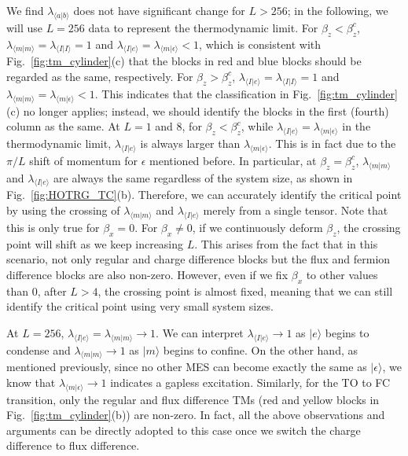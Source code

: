 \documentclass{ntuthesis}
\begin{document}
We find  $\lambda_{\langle a | b \rangle}$ does not  have significant change for  $L > 256$; in the following, we will use $L=256$ data to represent the thermodynamic limit.  
%
For $\beta_z < \beta_z^c$, $\lambda_{\langle m|m\rangle} = \lambda_{\langle I|I\rangle} = 1$ and $\lambda_{\langle I|e\rangle} = \lambda_{\langle m|\epsilon\rangle} <1$, which is consistent with Fig.~\ref{fig:tm_cylinder}(c) that the blocks in red and blue blocks should be regarded as the same, respectively.
%
 For $\beta_z > \beta_z^c$, $\lambda_{\langle I|e\rangle} = \lambda_{\langle I|I\rangle} = 1$ and $\lambda_{\langle m|m\rangle} = \lambda_{\langle m|\epsilon\rangle} <1$. 
 This indicates that the classification in Fig.~\ref{fig:tm_cylinder}(c) no longer applies; instead, we should identify the blocks in the first (fourth) column as the same.
%
At $L = 1$ and $8$, for $\beta_z < \beta_z^c$, while $\lambda_{\langle I|e\rangle} = \lambda_{\langle m|\epsilon\rangle} $ in the thermodynamic limit, $\lambda_{\langle I|e\rangle} $ is always larger than $\lambda_{\langle m|\epsilon\rangle}$. 
%
This is in fact due to the $\pi/L$ shift of momentum for $\epsilon$ mentioned before.
%
In particular, at   $\beta_z = \beta_z^c$,   $\lambda_{\langle m|m\rangle}$ and $\lambda_{\langle I|e\rangle}$ are always the same regardless of the system size, as shown in Fig.~\ref{fig:HOTRG_TC}(b). 
%
Therefore, we can accurately identify the critical point by using the crossing of $\lambda_{\langle m|m\rangle}$ and $\lambda_{\langle I|e\rangle}$ merely from a single tensor. 
%
Note that this is only true for $\beta_x = 0$. 
%
For $\beta_x\ne 0$, if we continuously deform $\beta_z$, the crossing point will shift  as we keep increasing $L$. 
%
This arises from the fact that in this scenario, not only regular and charge difference blocks but the flux and fermion difference blocks are also non-zero. 
%
However, even if we fix $\beta_x$ to other values than $0$, after $L > 4$, the crossing point is almost fixed, meaning that we can still identify the critical point using very small system sizes. 

At $L = 256$, $\lambda_{\langle I|e\rangle}  = \lambda_{\langle m|m\rangle} \rightarrow 1$. 
%
We can interpret $\lambda_{\langle I|e\rangle} \rightarrow 1$ as $|e\rangle$ begins to condense and $\lambda_{\langle m|m\rangle} \rightarrow 1$ as $|m\rangle$ begins to confine.
%
On the other hand, as mentioned previously, since no other MES can become exactly the same as $|\epsilon\rangle$, we know that $\lambda_{\langle m|\epsilon \rangle} \rightarrow 1$ indicates a gapless excitation.
%
Similarly, for the TO to FC transition, only the regular and flux difference  TMs (red and yellow blocks in Fig.~\ref{fig:tm_cylinder}(b)) are non-zero.
%
In fact, all the above observations and arguments can be directly adopted to this case once we switch the charge difference to flux difference. 
\end{document}
